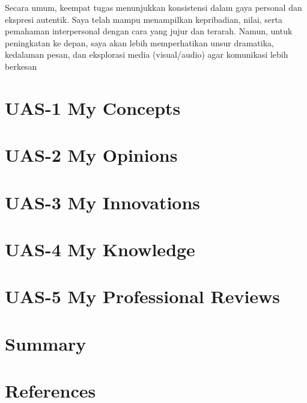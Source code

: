 \documentclass[
  letterpaper,
  DIV=11,
  numbers=noendperiod]{scrreprt}
\begin{document}
Secara umum, keempat tugas menunjukkan konsistensi dalam gaya personal
dan ekspresi autentik. Saya telah mampu menampilkan kepribadian, nilai,
serta pemahaman interpersonal dengan cara yang jujur dan terarah. Namun,
untuk peningkatan ke depan, saya akan lebih memperhatikan unsur
dramatika, kedalaman pesan, dan eksplorasi media (visual/audio) agar
komunikasi lebih berkesan


\chapter{UAS-1 My Concepts}\label{uas-1-my-concepts}


\chapter{UAS-2 My Opinions}\label{uas-2-my-opinions}


\chapter{UAS-3 My Innovations}\label{uas-3-my-innovations}


\chapter{UAS-4 My Knowledge}\label{uas-4-my-knowledge}


\chapter{UAS-5 My Professional
Reviews}\label{uas-5-my-professional-reviews}


\chapter{Summary}\label{summary}


\chapter*{References}\label{references}


\label{refs}
\end{document}
